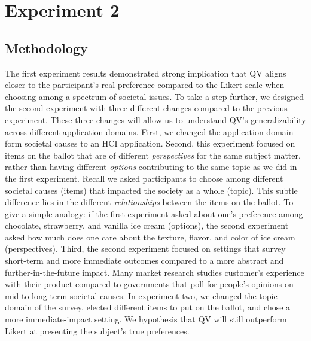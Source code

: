 \section{Experiment 2}
\subsection{Methodology} \label{method-2}


The first experiment results demonstrated strong implication that QV aligns closer to the participant's real preference compared to the Likert scale when choosing among a spectrum of societal issues. To take a step further, we designed the second experiment with three different changes compared to the previous experiment. These three changes will allow us to understand QV's generalizability across different application domains. First, we changed the application domain form societal causes to an HCI application. Second, this experiment focused on items on the ballot that are of different \textit{perspectives} for the same subject matter, rather than having different \textit{options} contributing to the same topic as we did in the first experiment. Recall we asked participants to choose among different societal causes (items) that impacted the society as a whole (topic). This subtle difference lies in the different \textit{relationships} between the items on the ballot. To give a simple analogy: if the first experiment asked about one's preference among chocolate, strawberry, and vanilla ice cream (options), the second experiment asked how much does one care about the texture, flavor, and color of ice cream (perspectives). Third, the second experiment focused on settings that survey short-term and more immediate outcomes compared to a more abstract and further-in-the-future impact. Many market research studies customer's experience with their product compared to governments that poll for people's opinions on mid to long term societal causes. In experiment two, we changed the topic domain of the survey, elected different items to put on the ballot, and chose a more immediate-impact setting. We hypothesis that QV will still outperform Likert at presenting the subject's true preferences. 

